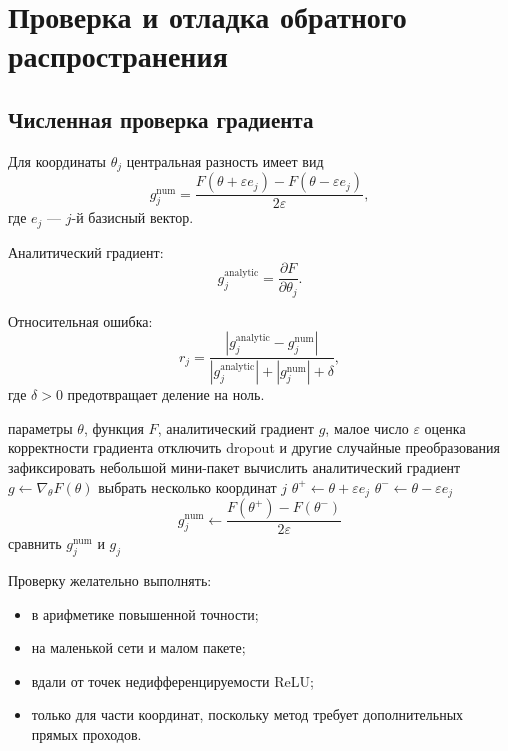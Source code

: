 \documentclass[12pt,a4paper]{article}
\theoremstyle{plain}
\theoremstyle{definition}
\theoremstyle{remark}
\newcommand{\abs}[1]{\left| #1 \right|}
\begin{document}
\section{Проверка и отладка обратного распространения}

\subsection{Численная проверка градиента}

Для координаты $\theta_j$ центральная разность имеет вид
\[
    g_j^{\mathrm{num}}
    =
    \frac{
        F(\theta+\varepsilon e_j)
        -
        F(\theta-\varepsilon e_j)
    }{
        2\varepsilon
    },
\]
где $e_j$ --- $j$-й базисный вектор.

Аналитический градиент:
\[
    g_j^{\mathrm{analytic}}
    =
    \frac{\partial F}{\partial\theta_j}.
\]

Относительная ошибка:
\[
    r_j
    =
    \frac{
        \abs{
            g_j^{\mathrm{analytic}}
            -
            g_j^{\mathrm{num}}
        }
    }{
        \abs{g_j^{\mathrm{analytic}}}
        +
        \abs{g_j^{\mathrm{num}}}
        +
        \delta
    },
\]
где $\delta>0$ предотвращает деление на ноль.

\begin{algorithm}[H]
\caption{Проверка градиента конечными разностями}
\begin{algorithmic}[1]
\Require параметры $\theta$, функция $F$, аналитический градиент
$g$, малое число $\varepsilon$
\Ensure оценка корректности градиента
\State отключить dropout и другие случайные преобразования
\State зафиксировать небольшой мини-пакет
\State вычислить аналитический градиент
$g\gets\nabla_\theta F(\theta)$
\State выбрать несколько координат $j$
    \State
    $\theta^+\gets\theta+\varepsilon e_j$
    \State
    $\theta^-\gets\theta-\varepsilon e_j$
    \State
    \[
        g_j^{\mathrm{num}}
        \gets
        \frac{
            F(\theta^+)-F(\theta^-)
        }{
            2\varepsilon
        }
    \]
    \State сравнить $g_j^{\mathrm{num}}$ и $g_j$
\EndFor
\end{algorithmic}
\end{algorithm}

Проверку желательно выполнять:

\begin{itemize}
    \item в арифметике повышенной точности;
    \item на маленькой сети и малом пакете;
    \item вдали от точек недифференцируемости ReLU;
    \item только для части координат, поскольку метод требует
    дополнительных прямых проходов.
\end{itemize}
\end{document}
